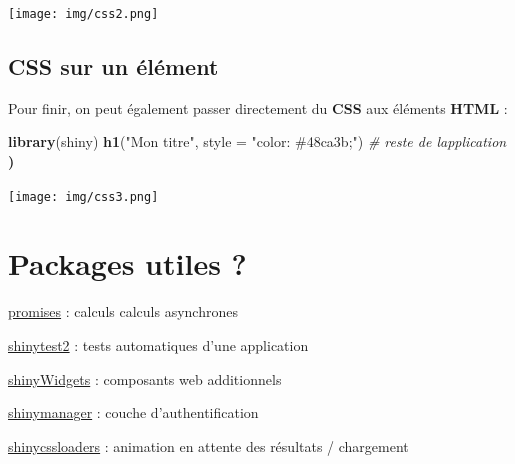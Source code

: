 \documentclass[
]{article}
\newenvironment{Shaded}{\begin{snugshade}}{\end{snugshade}}
\newcommand{\AttributeTok}[1]{\textcolor[rgb]{0.13,0.29,0.53}{#1}}
\newcommand{\CommentTok}[1]{\textcolor[rgb]{0.56,0.35,0.01}{\textit{#1}}}
\newcommand{\ErrorTok}[1]{\textcolor[rgb]{0.64,0.00,0.00}{\textbf{#1}}}
\newcommand{\FunctionTok}[1]{\textcolor[rgb]{0.13,0.29,0.53}{\textbf{#1}}}
\newcommand{\NormalTok}[1]{#1}
\newcommand{\SpecialCharTok}[1]{\textcolor[rgb]{0.81,0.36,0.00}{\textbf{#1}}}
\newcommand{\StringTok}[1]{\textcolor[rgb]{0.31,0.60,0.02}{#1}}
\begin{document}
\begin{Shaded}
\end{Shaded}

\texttt{[image: img/css2.png]}

\hypertarget{css-sur-un-uxe9luxe9ment}{%
\subsection{CSS sur un élément}\label{css-sur-un-uxe9luxe9ment}}

Pour finir, on peut également passer directement du \textbf{CSS} aux
éléments \textbf{HTML} :

\begin{Shaded}
\begin{Highlighting}[]
\FunctionTok{library}\NormalTok{(shiny)}
\FunctionTok{h1}\NormalTok{(}\StringTok{"Mon titre"}\NormalTok{, }\AttributeTok{style =} \StringTok{"color: \#48ca3b;"}\NormalTok{)}
\CommentTok{\# reste de l\textquotesingle{}application}
\ErrorTok{)}
\end{Highlighting}
\end{Shaded}

\texttt{[image: img/css3.png]}

\hypertarget{packages-utiles}{%
\section{Packages utiles ?}\label{packages-utiles}}

\href{https://rstudio.github.io/promises/articles/promises_06_shiny.html}{promises}
: calculs calculs asynchrones

\href{https://rstudio.github.io/shinytest2/}{shinytest2} : tests
automatiques d'une application

\href{https://shinyapps.dreamrs.fr/shinyWidgets/}{shinyWidgets} :
composants web additionnels

\href{https://datastorm-open.github.io/shinymanager/}{shinymanager} :
couche d'authentification

\href{https://daattali.com/shiny/shinycssloaders-demo/}{shinycssloaders}
: animation en attente des résultats / chargement
\end{document}
